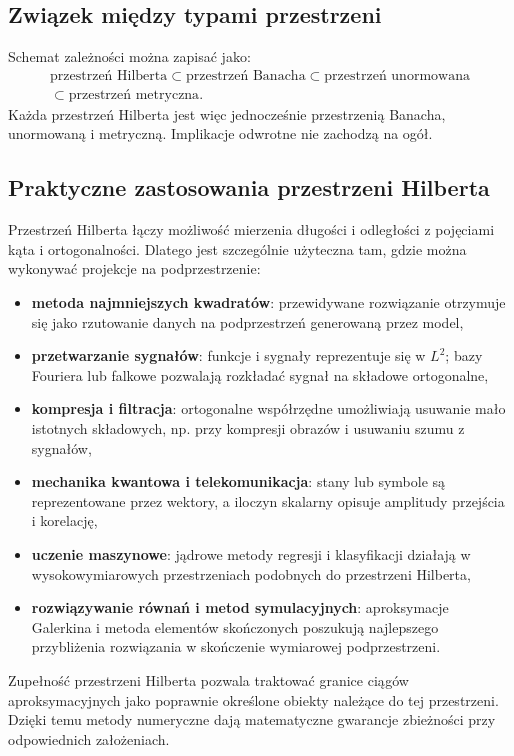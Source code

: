 \documentclass{article}
\begin{document}
\subsection{Związek między typami przestrzeni}
Schemat zależności można zapisać jako:
\[
\boxed{
\begin{gathered}
\text{przestrzeń Hilberta}
\subset \text{przestrzeń Banacha}
\subset \text{przestrzeń unormowana}\\
\subset \text{przestrzeń metryczna}.
\end{gathered}
}
\]
Każda przestrzeń Hilberta jest więc jednocześnie przestrzenią Banacha, unormowaną i metryczną. Implikacje odwrotne nie zachodzą na ogół.

\subsection{Praktyczne zastosowania przestrzeni Hilberta}
Przestrzeń Hilberta łączy możliwość mierzenia długości i odległości z pojęciami kąta i ortogonalności. Dlatego jest szczególnie użyteczna tam, gdzie można wykonywać projekcje na podprzestrzenie:
\begin{itemize}
    \item \textbf{metoda najmniejszych kwadratów}: przewidywane rozwiązanie otrzymuje się jako rzutowanie danych na podprzestrzeń generowaną przez model,
    \item \textbf{przetwarzanie sygnałów}: funkcje i sygnały reprezentuje się w $L^2$; bazy Fouriera lub falkowe pozwalają rozkładać sygnał na składowe ortogonalne,
    \item \textbf{kompresja i filtracja}: ortogonalne współrzędne umożliwiają usuwanie mało istotnych składowych, np. przy kompresji obrazów i usuwaniu szumu z sygnałów,
    \item \textbf{mechanika kwantowa i telekomunikacja}: stany lub symbole są reprezentowane przez wektory, a iloczyn skalarny opisuje amplitudy przejścia i korelację,
    \item \textbf{uczenie maszynowe}: jądrowe metody regresji i klasyfikacji działają w wysokowymiarowych przestrzeniach podobnych do przestrzeni Hilberta,
    \item \textbf{rozwiązywanie równań i metod symulacyjnych}: aproksymacje Galerkina i metoda elementów skończonych poszukują najlepszego przybliżenia rozwiązania w skończenie wymiarowej podprzestrzeni.
\end{itemize}
Zupełność przestrzeni Hilberta pozwala traktować granice ciągów aproksymacyjnych jako poprawnie określone obiekty należące do tej przestrzeni. Dzięki temu metody numeryczne dają matematyczne gwarancje zbieżności przy odpowiednich założeniach.
\end{document}
